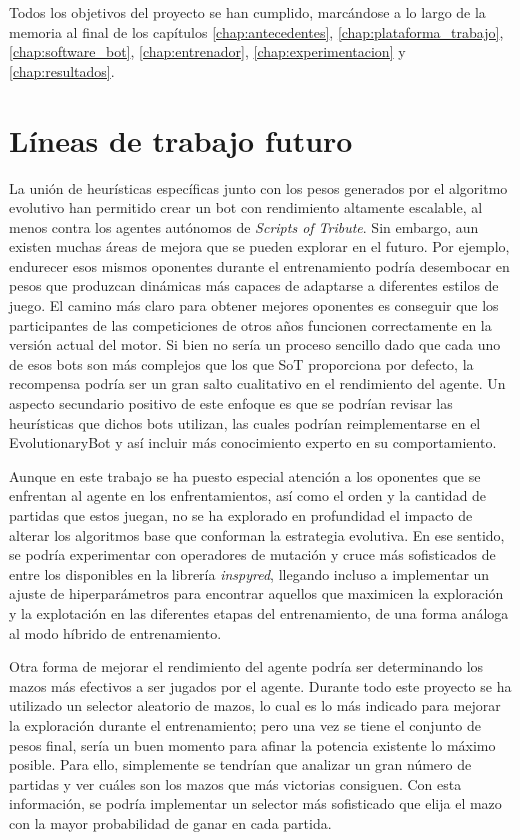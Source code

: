 Todos los objetivos del proyecto se han cumplido, marcándose a lo largo de la memoria al final de los capítulos \ref{chap:antecedentes}, \ref{chap:plataforma_trabajo}, 
\ref{chap:software_bot}, \ref{chap:entrenador}, \ref{chap:experimentacion} y \ref{chap:resultados}.


\section{Líneas de trabajo futuro} \label{sec:trabajo_futuro}

La unión de heurísticas específicas junto con los pesos generados por el algoritmo evolutivo han permitido crear un bot con rendimiento altamente escalable, al menos contra los agentes autónomos de \textit{Scripts of Tribute}. Sin embargo, aun existen muchas áreas de mejora que se pueden explorar en el futuro. Por ejemplo, endurecer esos mismos oponentes durante el entrenamiento podría desembocar en pesos que produzcan dinámicas más capaces de adaptarse a diferentes estilos de juego. El camino más claro para obtener mejores oponentes es conseguir que los participantes de las competiciones de otros años funcionen correctamente en la versión actual del motor. Si bien no sería un proceso sencillo dado que cada uno de esos bots son más complejos que los que SoT proporciona por defecto, la recompensa podría ser un gran salto cualitativo en el rendimiento del agente. Un aspecto secundario positivo de este enfoque es que se podrían revisar las heurísticas que dichos bots utilizan, las cuales podrían reimplementarse en el EvolutionaryBot y así incluir más conocimiento experto en su comportamiento.

Aunque en este trabajo se ha puesto especial atención a los oponentes que se enfrentan al agente en los enfrentamientos, así como el orden y la cantidad de partidas que estos juegan, no se ha explorado en profundidad el impacto de alterar los algoritmos base que conforman la estrategia evolutiva. En ese sentido, se podría experimentar con operadores de mutación y cruce más sofisticados de entre los disponibles en la librería \textit{inspyred}, llegando incluso a implementar un ajuste de hiperparámetros para encontrar aquellos que maximicen la exploración y la explotación en las diferentes etapas del entrenamiento, de una forma análoga al modo híbrido de entrenamiento.

Otra forma de mejorar el rendimiento del agente podría ser determinando los mazos más efectivos a ser jugados por el agente. Durante todo este proyecto se ha utilizado un selector aleatorio de mazos, lo cual es lo más indicado para mejorar la exploración durante el entrenamiento; pero una vez se tiene el conjunto de pesos final, sería un buen momento para afinar la potencia existente lo máximo posible. Para ello, simplemente se tendrían que analizar un gran número de partidas y ver cuáles son los mazos que más victorias consiguen. Con esta información, se podría implementar un selector más sofisticado que elija el mazo con la mayor probabilidad de ganar en cada partida.

